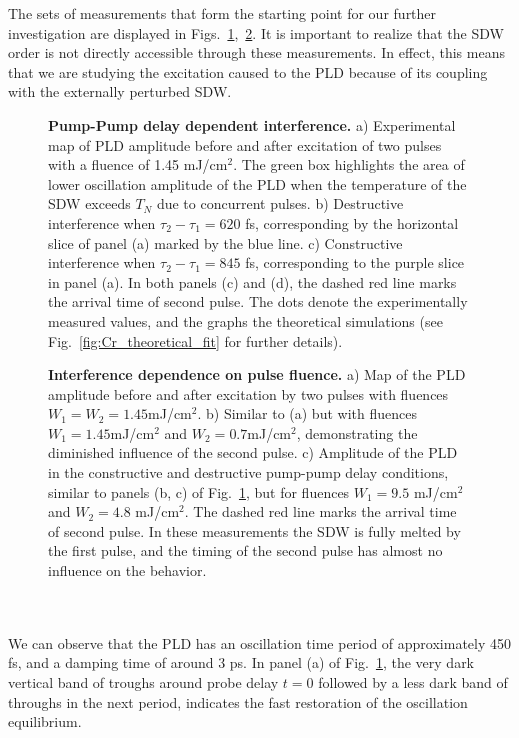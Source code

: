 The sets of measurements that form the starting point for our further investigation are displayed in Figs.~\ref{fig:Cr_experimental1},~\ref{fig:Cr_experimental2}.
It is important to realize that the SDW order is not directly accessible through these measurements. In effect, this means that we are studying the excitation caused to the PLD because of its coupling with the externally perturbed SDW.
\begin{figure}
	\centering
{}
\caption{\label{fig:Cr_experimental1}{\bf Pump-Pump delay dependent interference.} a) Experimental map of PLD amplitude before and after excitation of two pulses with a fluence of 1.45 mJ/cm$^2$. The green box highlights the area of lower oscillation amplitude of the PLD when the temperature of the SDW exceeds $T_N$ due to concurrent pulses. b) Destructive interference when $\tau_2 - \tau_1 = 620$ fs, corresponding by the horizontal slice of panel (a) marked by the blue line. c) Constructive interference when $\tau_2 - \tau_1 = 845$ fs, corresponding to the purple slice in panel (a). In both panels (c) and (d), the dashed red line marks the arrival time of second pulse. The dots denote the experimentally measured values, and the graphs the theoretical simulations (see Fig.~\ref{fig:Cr_theoretical_fit} for further details).}
\end{figure}
\begin{figure}
	\centering
{}
\caption{\label{fig:Cr_experimental2}{\bf Interference dependence on pulse fluence.} a) Map of the PLD amplitude before and after excitation by two pulses with fluences $W_1=W_2=1.45$mJ/cm$^2$. b) Similar to (a) but with fluences $W_1=1.45$mJ/cm$^2$ and $W_2=0.7$mJ/cm$^2$, demonstrating the diminished influence of the second pulse. c) Amplitude of the PLD in the constructive and destructive pump-pump delay conditions, similar to panels (b, c) of Fig.~\ref{fig:Cr_experimental1}, but for fluences $W_1 = 9.5$ mJ/cm$^2$ and $W_2 = 4.8$ mJ/cm$^2$. The dashed red line marks the arrival time of second pulse. In these measurements the SDW is fully melted by the first pulse, and the timing of the second pulse has almost no influence on the behavior.}
\end{figure}
\\\\
We can observe that the PLD has an oscillation time period of approximately 450 fs, and a damping time of around 3 ps.
In panel (a) of Fig.~\ref{fig:Cr_experimental1}, the very dark vertical band of troughs around probe delay $t = 0$ followed by a less dark band of throughs in the next period, indicates the fast restoration of the oscillation equilibrium. 
